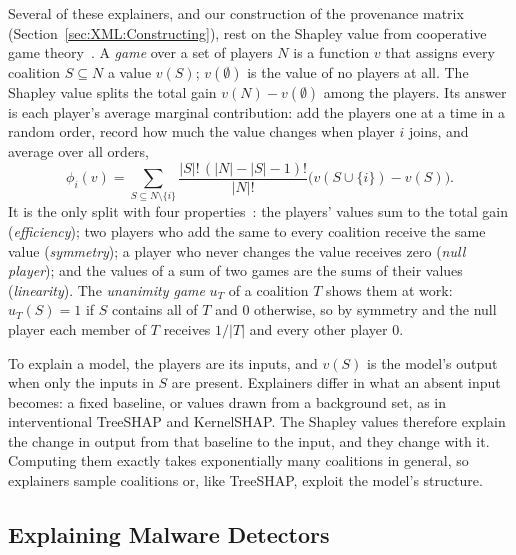 Several of these explainers, and our construction of the provenance matrix (Section~\ref{sec:XML:Constructing}), rest
on the Shapley value from cooperative game theory~\cite{shapley1953value}. A \emph{game} over a set of players $N$ is a
function $v$ that assigns every coalition $S \subseteq N$ a value $v(S)$; $v(\emptyset)$ is the value of no players at
all. The Shapley value splits the total gain $v(N) - v(\emptyset)$ among the players. Its answer is each player's
average marginal contribution: add the players one at a time in a random order, record how much the value changes when
player $i$ joins, and average over all orders,
\[
\phi_i(v) = \sum_{S \subseteq N \setminus \{i\}} \frac{|S|! \, (|N| - |S| - 1)!}{|N|!} \bigl( v(S \cup \{i\}) - v(S) \bigr).
\]
It is the only split with four properties~\cite{shapley1953value}: the players' values sum to the total gain
(\emph{efficiency}); two players who add the same to every coalition receive the same value (\emph{symmetry}); a player
who never changes the value receives zero (\emph{null player}); and the values of a sum of two games are the sums of
their values (\emph{linearity}). The \emph{unanimity game} $u_T$ of a coalition $T$ shows them at work: $u_T(S) = 1$ if
$S$ contains all of $T$ and $0$ otherwise, so by symmetry and the null player each member of $T$ receives $1/|T|$ and
every other player $0$.

To explain a model, the players are its inputs, and $v(S)$ is the model's output when only the inputs in $S$ are
present. Explainers differ in what an absent input becomes: a fixed baseline, or values drawn from a background set, as
in interventional TreeSHAP and KernelSHAP. The Shapley values therefore explain the change in output from that baseline
to the input, and they change with it. Computing them exactly takes exponentially many coalitions in general, so
explainers sample coalitions or, like TreeSHAP, exploit the model's structure.

\subsection{Explaining Malware Detectors}
\label{sec:XML:BgMalwareXAI}

